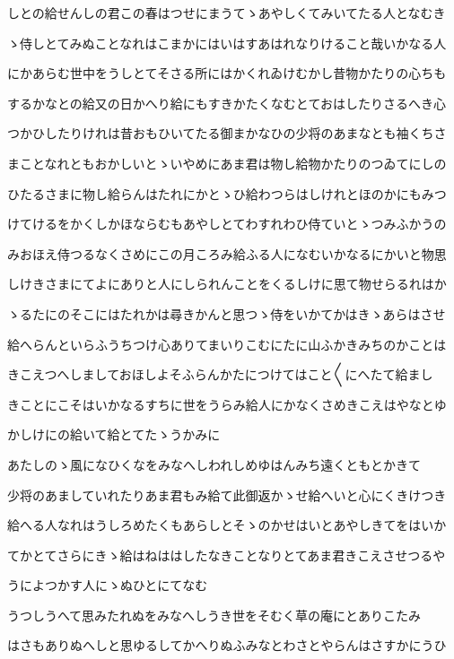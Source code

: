 \documentclass[a4paper,11pt,landscape]{ltjtarticle}
\begin{document}
\par\medskip
しとの給せんしの君この春はつせにまうてゝあやしくてみいてたる人となむき
\par\medskip
ゝ侍しとてみぬことなれはこまかにはいはすあはれなりけること哉いかなる人
\par\medskip
にかあらむ世中をうしとてそさる所にはかくれゐけむかし昔物かたりの心ちも
\par\medskip
するかなとの給又の日かへり給にもすきかたくなむとておはしたりさるへき心
\par\medskip
つかひしたりけれは昔おもひいてたる御まかなひの少将のあまなとも袖くちさ
\par\medskip
まことなれともおかしいとゝいやめにあま君は物し給物かたりのつゐてにしの
\par\medskip
ひたるさまに物し給らんはたれにかとゝひ給わつらはしけれとほのかにもみつ
\par\medskip
けてけるをかくしかほならむもあやしとてわすれわひ侍ていとゝつみふかうの
\par\medskip
みおほえ侍つるなくさめにこの月ころみ給ふる人になむいかなるにかいと物思
\par\medskip
しけきさまにてよにありと人にしられんことをくるしけに思て物せらるれはか
\par\medskip
ゝるたにのそこにはたれかは尋きかんと思つゝ侍をいかてかはきゝあらはさせ
\par\medskip
給へらんといらふうちつけ心ありてまいりこむにたに山ふかきみちのかことは
\par\medskip
きこえつへしましておほしよそふらんかたにつけてはこと〱にへたて給まし
\par\medskip
きことにこそはいかなるすちに世をうらみ給人にかなくさめきこえはやなとゆ
\par\medskip
かしけにの給いて給とてたゝうかみに
\par\medskip
あたしのゝ風になひくなをみなへしわれしめゆはんみち遠くともとかきて
\par\medskip
少将のあましていれたりあま君もみ給て此御返かゝせ給へいと心にくきけつき
\par\medskip
給へる人なれはうしろめたくもあらしとそゝのかせはいとあやしきてをはいか
\par\medskip
てかとてさらにきゝ給はねははしたなきことなりとてあま君きこえさせつるや
\par\medskip
うによつかす人にゝぬひとにてなむ
\par\medskip
うつしうへて思みたれぬをみなへしうき世をそむく草の庵にとありこたみ
\par\medskip
はさもありぬへしと思ゆるしてかへりぬふみなとわさとやらんはさすかにうひ
\end{document}
